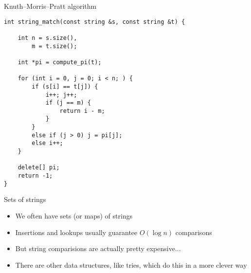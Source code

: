 \documentclass[12pt,t]{beamer}
\newcommand{\bi}{\begin{itemize}}
\newcommand{\ei}{\end{itemize}}
\begin{document}
\begin{frame}[fragile]{Knuth--Morris--Pratt algorithm}
    \begin{verbatim}
int string_match(const string &s, const string &t) {

    int n = s.size(),
        m = t.size();

    int *pi = compute_pi(t);

    for (int i = 0, j = 0; i < n; ) {
        if (s[i] == t[j]) {
            i++; j++;
            if (j == m) {
                return i - m;
            }
        }
        else if (j > 0) j = pi[j];
        else i++;
    }

    delete[] pi;
    return -1;
}
    \end{verbatim}
\end{frame}

\begin{frame}{Sets of strings}
    \vspace{30pt}
    \bi
\item We often have sets (or maps) of strings
\item Insertions and lookups usually guarantee $O(\log n)$ comparisons
    \vspace{10pt}
\item But string comparisions are actually pretty expensive...
    \vspace{10pt}
\item There are other data structures, like tries, which do this in a more clever way
    \ei
\end{frame}
\end{document}
